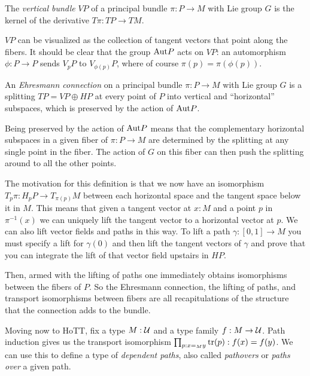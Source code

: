\begin{mydef}
The \emph{vertical bundle} \( VP \) of a principal bundle \( \pi:P\to M \) with Lie group \( G \) is the kernel of the derivative \( T\pi:TP\to TM \). 
\end{mydef}

\( VP \) can be visualized as the collection of tangent vectors that point along the fibers. It should be clear that the group \( \mathrm{Aut} P \) acts on \( VP \): an automorphism \( \phi:P\to P \) sends \( V_pP \) to \( V_{\phi(p)}P \), where of course \( \pi(p)=\pi(\phi(p)) \).

\begin{mydef}
An \emph{Ehresmann connection} on a principal bundle \( \pi:P\to M \) with Lie group \( G \) is a splitting \( TP=VP\oplus HP \) at every point of \( P \) into vertical and ``horizontal'' subspaces, which is preserved by the action of \( \mathrm{Aut} P \).
\end{mydef}

Being preserved by the action of \( \mathrm{Aut} P \) means that the complementary horizontal subspaces in a given fiber of \( \pi:P\to M \) are determined by the splitting at any single point in the fiber. The action of \( G \) on this fiber can then push the splitting around to all the other points.

The motivation for this definition is that we now have an isomorphism \( T_p\pi:H_pP\to T_{\pi(p)}M \) between each horizontal space and the tangent space below it in \( M \). This means that given a tangent vector at \( x:M \) and a point \( p \) in \( \pi^{-1}(x) \) we can uniquely lift the tangent vector to a horizontal vector at \( p \). We can also lift vector fields and paths in this way. To lift a path \( \gamma:[0,1]\to M \) you must specify a lift for \( \gamma(0) \) and then lift the tangent vectors of \( \gamma \) and prove that you can integrate the lift of that vector field upstairs in \( HP \).

Then, armed with the lifting of paths one immediately obtains isomorphisms between the fibers of \( P \). So the Ehresmann connection, the lifting of paths, and transport isomorphisms between fibers are all recapitulations of the structure that the connection adds to the bundle.

Moving now to HoTT, fix a type \( M:\mathcal{U} \) and a type family \( f:M\to\mathcal{U} \). Path induction gives us the transport isomorphism \( \prod_{p:x=_M y}\mathrm{tr}(p):f(x)=f(y) \). We can use this to define a type of \emph{dependent paths}, also called \emph{pathovers} or \emph{paths over} a given path.

